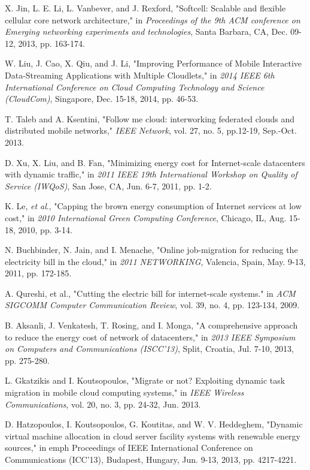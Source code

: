 \documentclass[journal,12pt,draftclsnofoot,onecolumn]{IEEEtran}
\begin{document}
\begin{titlepage}
\begin{center}
\begin{thebibliography}{15}
X. Jin, L. E. Li, L. Vanbever, and J. Rexford, "Softcell: Scalable and flexible cellular core network architecture," in \emph{Proceedings of the 9th ACM conference on Emerging networking experiments and technologies}, Santa Barbara, CA, Dec. 09-12, 2013, pp. 163-174.

W. Liu, J. Cao, X. Qiu, and J. Li, "Improving Performance of Mobile Interactive Data-Streaming Applications with Multiple Cloudlets," in \emph{ 2014 IEEE 6th International Conference on Cloud Computing Technology and Science (CloudCom)}, Singapore, Dec. 15-18, 2014, pp. 46-53.

T. Taleb and A. Ksentini, "Follow me cloud: interworking federated clouds and distributed mobile networks," \emph{IEEE Network}, vol. 27, no. 5, pp.12-19, Sep.-Oct. 2013.

D. Xu, X. Liu, and B. Fan, "Minimizing energy cost for Internet-scale datacenters with dynamic traffic," in \emph{2011 IEEE 19th International Workshop on Quality of Service (IWQoS)}, San Jose, CA, Jun. 6-7, 2011, pp. 1-2.

K. Le, \emph{et al}., "Capping the brown energy consumption of Internet services at low cost," in \emph{2010 International Green Computing Conference}, Chicago, IL, Aug. 15-18, 2010, pp. 3-14.

N. Buchbinder, N. Jain, and I. Menache, "Online job-migration for reducing the electricity bill in the cloud," in \emph{2011 NETWORKING}, Valencia, Spain, May. 9-13, 2011, pp. 172-185. 

A. Qureshi, et al., "Cutting the electric bill for internet-scale systems." in \emph{ACM SIGCOMM Computer Communication Review}, vol. 39, no. 4, pp. 123-134, 2009.

B. Aksanli, J. Venkatesh, T. Rosing, and I. Monga, "A comprehensive approach to reduce the energy cost of network of datacenters," in \emph{2013 IEEE Symposium on Computers and Communications (ISCC'13)}, Split, Croatia, Jul. 7-10, 2013, pp. 275-280.

L. Gkatzikis and I. Koutsopoulos, "Migrate or not? Exploiting dynamic task migration in mobile cloud computing systems," in \emph{IEEE Wireless Communications}, vol. 20, no. 3, pp. 24-32, Jun. 2013.

D. Hatzopoulos, I. Koutsopoulos, G. Koutitas, and W. V. Heddeghem, "Dynamic virtual machine allocation in cloud server facility systems with renewable energy sources," in emph{ Proceedings of IEEE International Conference on Communications (ICC'13)}, Budapest, Hungary, Jun. 9-13, 2013, pp. 4217-4221.


\end{thebibliography}
\end{center}
\end{titlepage}
\end{document}
